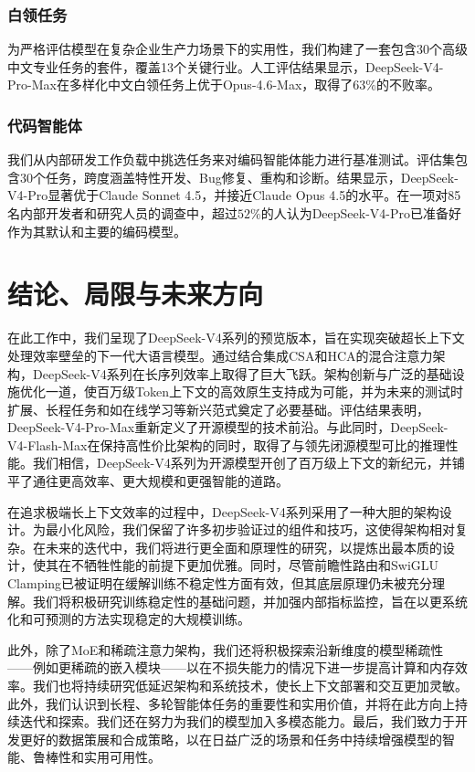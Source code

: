 \documentclass[11pt,a4paper]{article}
\newcommand{\dsvfour}{DeepSeek-V4}
\newcommand{\dsvfourpro}{DeepSeek-V4-Pro}
\newcommand{\dsvfourpromax}{DeepSeek-V4-Pro-Max}
\newcommand{\dsvfourflashmax}{DeepSeek-V4-Flash-Max}
\newcommand{\moe}{MoE}
\begin{document}
\subsubsection{白领任务}
为严格评估模型在复杂企业生产力场景下的实用性，我们构建了一套包含30个高级中文专业任务的套件，覆盖13个关键行业。人工评估结果显示，\dsvfourpromax 在多样化中文白领任务上优于Opus-4.6-Max，取得了\(63\%\)的不败率。

\subsubsection{代码智能体}
我们从内部研发工作负载中挑选任务来对编码智能体能力进行基准测试。评估集包含30个任务，跨度涵盖特性开发、Bug修复、重构和诊断。结果显示，\dsvfourpro 显著优于Claude Sonnet 4.5，并接近Claude Opus 4.5的水平。在一项对85名内部开发者和研究人员的调查中，超过\(52\%\)的人认为\dsvfourpro 已准备好作为其默认和主要的编码模型。

\section{结论、局限与未来方向}

在此工作中，我们呈现了\dsvfour 系列的预览版本，旨在实现突破超长上下文处理效率壁垒的下一代大语言模型。通过结合集成CSA和HCA的混合注意力架构，\dsvfour 系列在长序列效率上取得了巨大飞跃。架构创新与广泛的基础设施优化一道，使百万级Token上下文的高效原生支持成为可能，并为未来的测试时扩展、长程任务和如在线学习等新兴范式奠定了必要基础。评估结果表明，\dsvfourpromax 重新定义了开源模型的技术前沿。与此同时，\dsvfourflashmax 在保持高性价比架构的同时，取得了与领先闭源模型可比的推理性能。我们相信，\dsvfour 系列为开源模型开创了百万级上下文的新纪元，并铺平了通往更高效率、更大规模和更强智能的道路。

在追求极端长上下文效率的过程中，\dsvfour 系列采用了一种大胆的架构设计。为最小化风险，我们保留了许多初步验证过的组件和技巧，这使得架构相对复杂。在未来的迭代中，我们将进行更全面和原理性的研究，以提炼出最本质的设计，使其在不牺牲性能的前提下更加优雅。同时，尽管前瞻性路由和SwiGLU Clamping已被证明在缓解训练不稳定性方面有效，但其底层原理仍未被充分理解。我们将积极研究训练稳定性的基础问题，并加强内部指标监控，旨在以更系统化和可预测的方法实现稳定的大规模训练。

此外，除了\moe{}和稀疏注意力架构，我们还将积极探索沿新维度的模型稀疏性——例如更稀疏的嵌入模块——以在不损失能力的情况下进一步提高计算和内存效率。我们也将持续研究低延迟架构和系统技术，使长上下文部署和交互更加灵敏。此外，我们认识到长程、多轮智能体任务的重要性和实用价值，并将在此方向上持续迭代和探索。我们还在努力为我们的模型加入多模态能力。最后，我们致力于开发更好的数据策展和合成策略，以在日益广泛的场景和任务中持续增强模型的智能、鲁棒性和实用可用性。
\end{document}
